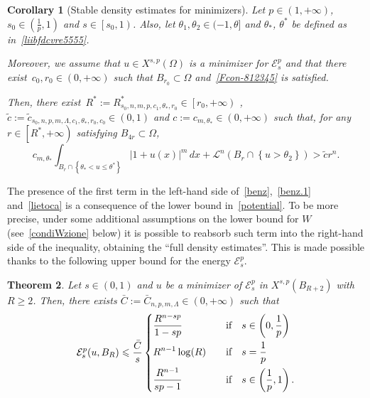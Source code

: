 \documentclass[12pt]{article}
\numberwithin{equation}{section}
\newtheorem{thm}{Theorem}[section]
\newtheorem{cor}[thm]{Corollary}
\renewcommand{\leq}{\leqslant}
\renewcommand{\geq}{\geqslant}
\begin{document}
\begin{cor}[Stable density estimates for minimizers]\label{bmrlsadcbl}
Let $p\in (1,+\infty)$, $s_0\in \left(\frac{1}{p} ,1\right)$ and $s\in \left[s_0,1\right)$. Also, let $\theta_1,\theta_2\in (-1,\theta]$ and $\theta_*$, $\theta^*$ be defined as in~\eqref{liibfdcvre5555}. 

Moreover, we assume that $u\in X^{s,p}(\Omega)$ is a minimizer for $\mathcal{E}_s^p$ and that there exist~$c_0,r_0\in (0,+\infty)$ such that $B_{r_0}\subset\Omega$ and~\eqref{Fcon-812345} is satisfied. 

Then, there exist~$R^*:=R_{s_0,n,m,p,c_1,\theta_*,r_0}^*\in\left[r_0,+\infty\right)$ , $\tilde{c}:=\tilde{c}_{s_0,n,p,m,\Lambda,c_1,\theta_*,r_0,c_0}\in (0,1)$ and $c:=c_{m,\theta_*}\in(0,+\infty)$ such that, for any $r\in \left[R^*,+\infty\right)$ satisfying $B_{4r}\subset \Omega$,
\begin{equation}\label{lietoca}
c_{m,\theta_*}\int_{B_r\cap \left\lbrace \theta_{*}<u\leq \theta^* \right\rbrace}\left|1+u(x)\right|^m\,dx+\mathcal{L}^n(B_r\cap \left\lbrace u>\theta_2 \right\rbrace)>\tilde{c}r^n.
\end{equation}
\end{cor}


The presence of the first term in the left-hand side of~\eqref{benz},~\eqref{benz.1} and~\eqref{lietoca} is a consequence of the lower bound in~\eqref{potential}. To be more precise, under some additional assumptions on the lower bound for $W$ (see~\eqref{condiWzione} below) it is possible to reabsorb such term into the right-hand side of the inequality, obtaining the ``full density estimates''. This is made possible thanks to the following upper bound for the energy $\mathcal{E}_s^p$.  

\begin{thm}\label{qteanldeeo}
Let $s\in (0,1)$ and $u$ be a minimizer of $\mathcal{E}_s^p$ in $X^{s,p}(B_{R+2})$ with $R\geq 2$. Then, there exists $\bar{C}:=\bar{C}_{n,p,m,\Lambda}\in(0,+\infty)$ such that 
\begin{equation}\label{BFAOTE}
\mathcal{E}_s^p(u,B_R)\leq \frac{\bar{C}}{s}\begin{dcases}
\frac{R^{n-sp}}{1-sp}\quad &\mbox{if}\quad s\in \left(0,\frac{1}{p}\right)\\
R^{n-1}\log(R)\quad &\mbox{if}\quad s=\frac{1}{p}\\
\frac{R^{n-1}}{sp-1}\quad &\mbox{if}\quad s\in \left(\frac{1}{p},1\right).
\end{dcases}
\end{equation} 
\end{thm}
\end{document}
